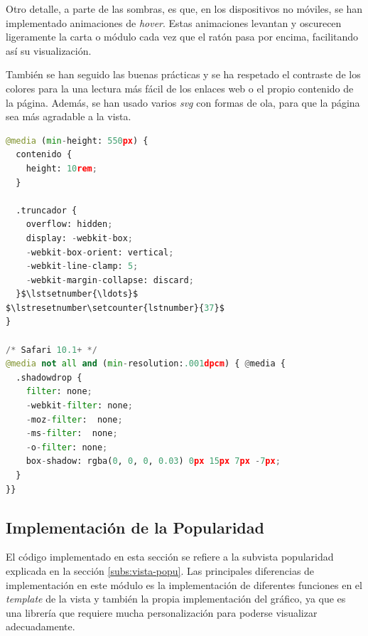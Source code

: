 Otro detalle, a parte de las sombras, es que, en los dispositivos no móviles, se han implementado animaciones de \textit{hover}. Estas animaciones levantan y oscurecen ligeramente la carta o módulo cada vez que el ratón pasa por encima, facilitando así su visualización.

\vspace{0.3cm}

También se han seguido las buenas prácticas y se ha respetado el contraste de los colores para la una lectura más fácil de los enlaces web o el propio contenido de la página. Además, se han usado varios \textit{svg} con formas de ola, para que la página sea más agradable a la vista.

\vspace{0.3cm}

\begin{lstlisting}[caption=Detalles de la implementación del diseño,language=Python, mathescape=true]
@media (min-height: 550px) {
  contenido {
    height: 10rem;
  }

  .truncador {
    overflow: hidden;
    display: -webkit-box;
    -webkit-box-orient: vertical;
    -webkit-line-clamp: 5;
    -webkit-margin-collapse: discard;
  }$\lstsetnumber{\ldots}$
$\lstresetnumber\setcounter{lstnumber}{37}$
}

/* Safari 10.1+ */
@media not all and (min-resolution:.001dpcm) { @media {
  .shadowdrop {
    filter: none;
    -webkit-filter: none;
    -moz-filter:  none;
    -ms-filter:  none;
    -o-filter: none;
    box-shadow: rgba(0, 0, 0, 0.03) 0px 15px 7px -7px;
  }
}}
\end{lstlisting}

\subsection{Implementación de la Popularidad}
El código implementado en esta sección se refiere a la subvista popularidad explicada en la sección \ref{subs:vista-popu}. Las principales diferencias de implementación en este módulo es la implementación de diferentes funciones en el \textit{template} de la vista y también la propia implementación del gráfico, ya que es una librería que requiere mucha personalización para poderse visualizar adecuadamente.

\vspace{0.3cm}

